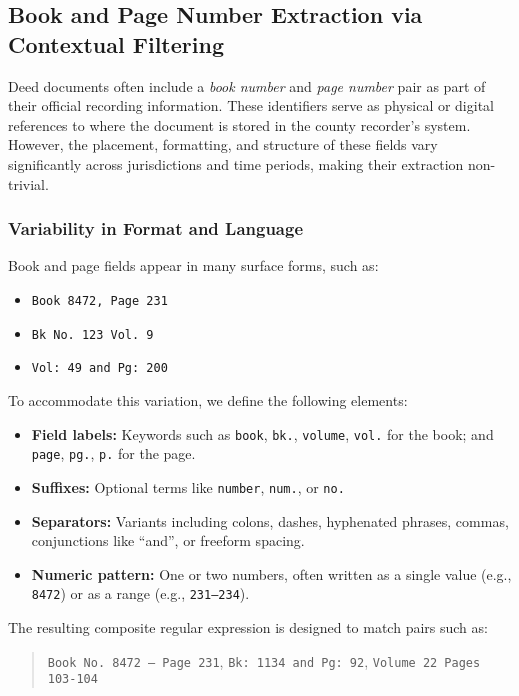 \documentclass{article}
\begin{document}
\subsection{Book and Page Number Extraction via Contextual Filtering}

Deed documents often include a \textit{book number} and \textit{page number} pair as part of their official recording information. These identifiers serve as physical or digital references to where the document is stored in the county recorder’s system. However, the placement, formatting, and structure of these fields vary significantly across jurisdictions and time periods, making their extraction non-trivial.

\subsubsection{Variability in Format and Language}

Book and page fields appear in many surface forms, such as:

\begin{itemize}
    \item \texttt{Book 8472, Page 231}
    \item \texttt{Bk No. 123 Vol. 9}
    \item \texttt{Vol: 49 and Pg: 200}
\end{itemize}

To accommodate this variation, we define the following elements:

\begin{itemize}
    \item \textbf{Field labels:} Keywords such as \texttt{book}, \texttt{bk.}, \texttt{volume}, \texttt{vol.} for the book; and \texttt{page}, \texttt{pg.}, \texttt{p.} for the page.
    \item \textbf{Suffixes:} Optional terms like \texttt{number}, \texttt{num.}, or \texttt{no.}
    \item \textbf{Separators:} Variants including colons, dashes, hyphenated phrases, commas, conjunctions like ``and'', or freeform spacing.
    \item \textbf{Numeric pattern:} One or two numbers, often written as a single value (e.g., \texttt{8472}) or as a range (e.g., \texttt{231--234}).
\end{itemize}

The resulting composite regular expression is designed to match pairs such as:

\begin{quote}
\texttt{Book No. 8472 -- Page 231}, \quad \texttt{Bk: 1134 and Pg: 92}, \quad \texttt{Volume 22 Pages 103-104}
\end{quote}
\end{document}
